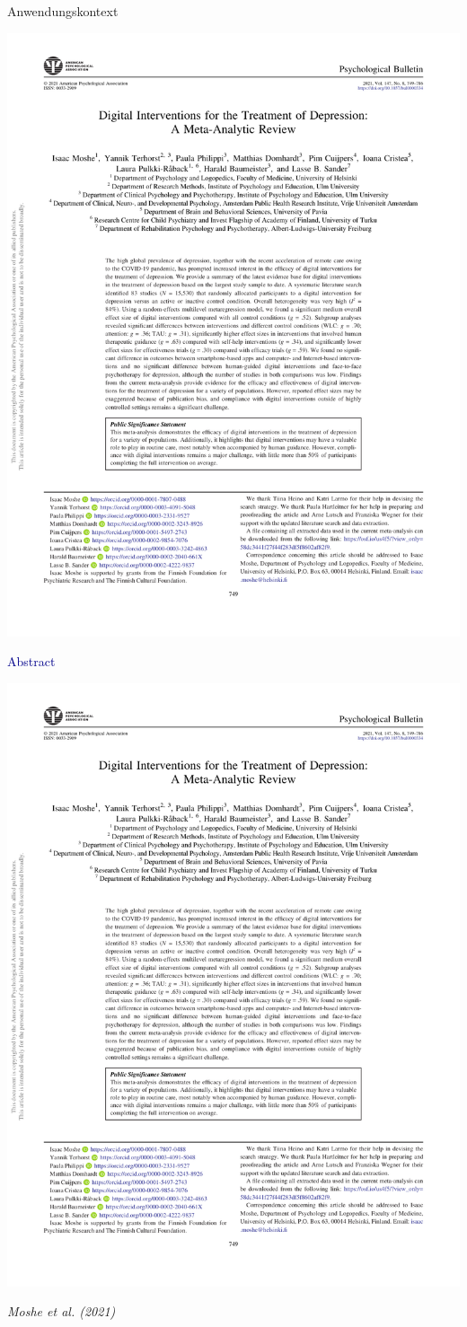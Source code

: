 \documentclass[
  8pt,
  ignorenonframetext,
]{beamer}
\begin{document}
\begin{frame}[t]{Anwendungskontext}
\protect\hypertarget{anwendungskontext-3}{}
\begin{center}\includegraphics[width=0.65\linewidth]{8_Abbildungen/alm_8_review_title} \end{center}
\center

\textcolor{darkblue}{Abstract}

\begin{center}\includegraphics[width=0.65\linewidth]{8_Abbildungen/alm_8_review_abstract} \end{center}
\flushright
\footnotesize

\emph{Moshe et al. (2021)}
\end{frame}
\end{document}
